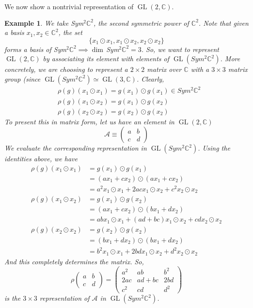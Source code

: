 \documentclass{article}
\DeclareMathOperator{\GL}{GL}
\newtheorem{example}{Example}[section]
\theoremstyle{remark}
\theoremstyle{definition}
\begin{document}
We now show a nontrivial representation of $\GL(2, \mathbb{C})$. 
\begin{example}
We take Sym$^2 \mathbb{C}^2$, the second symmetric power of $\mathbb{C}^2$. Note that given a basis $x_1, x_2 \in \mathbb{C}^2$, the set
\[\{x_1 \odot x_1, x_1 \odot x_2, x_2 \odot x_2\}\]
forms a basis of Sym$^2 \mathbb{C}^2 \implies \dim\,$Sym$^2 \mathbb{C}^2 = 3$. So, we want to represent $\GL(2, \mathbb{C})$ by associating its element with elements of $\GL(Sym^2 \mathbb{C}^2)$. More concretely, we are choosing to represent a $2 \times 2$ matrix over $\mathbb{C}$ with a $3 \times 3$ matrix group (since $\GL(Sym^2 \mathbb{C}^2) \simeq \GL(3, \mathbb{C})$. Clearly,
\begin{align*}
    & \rho(g) (x_1 \odot x_1) = g(x_1) \odot g(x_1) \in Sym^2 \mathbb{C}^2 \\
    & \rho(g) (x_1 \odot x_2) = g(x_1) \odot g(x_2) \\
    & \rho(g) (x_2 \odot x_2) = g(x_2) \odot g(x_2)
\end{align*}
To present this in matrix form, let us have an element in $\GL (2, \mathbb{C})$
\[\mathcal{A} \equiv \begin{pmatrix}
a & b \\
c & d
\end{pmatrix}\]
We evaluate the corresponding representation in $\GL( Sym^2 \mathbb{C}^2)$. Using the identities above, we have 
\begin{align*}
    \rho(g) (x_1 \odot x_1) & = g(x_1) \odot g(x_1) \\
    & = (a x_1 + c x_2) \odot (a x_1 + c x_2) \\
    & = a^2 x_1 \odot x_1 + 2ac x_1 \odot x_2 + c^2 x_2 \odot x_2 \\
    \rho(g) (x_1 \odot x_2) & = g(x_1) \odot g(x_2) \\
    & = (a x_1 + c x_2) \odot (b x_1 + d x_2) \\
    & = ab x_1 \odot x_1 + (ad + bc) x_1 \odot x_2 + cd x_2 \odot x_2 \\
    \rho(g) (x_2 \odot x_2) & = g(x_2) \odot g(x_2) \\
    & = (b x_1 + d x_2) \odot (b x_1 + d x_2) \\
    & = b^2 x_1 \odot x_1 + 2bd x_1 \odot x_2 + d^2 x_2 \odot x_2
\end{align*}
And this completely determines the matrix. So, 
\[\rho \begin{pmatrix}
a&b\\c&d
\end{pmatrix} = \begin{pmatrix}
a^2&ab&b^2\\2ac&ad+bc&2bd\\c^2&cd&d^2
\end{pmatrix}\]
is the $3 \times 3$ representation of $\mathcal{A}$ in $\GL(Sym^2 \mathbb{C}^2)$. 
\end{example}
\end{document}
